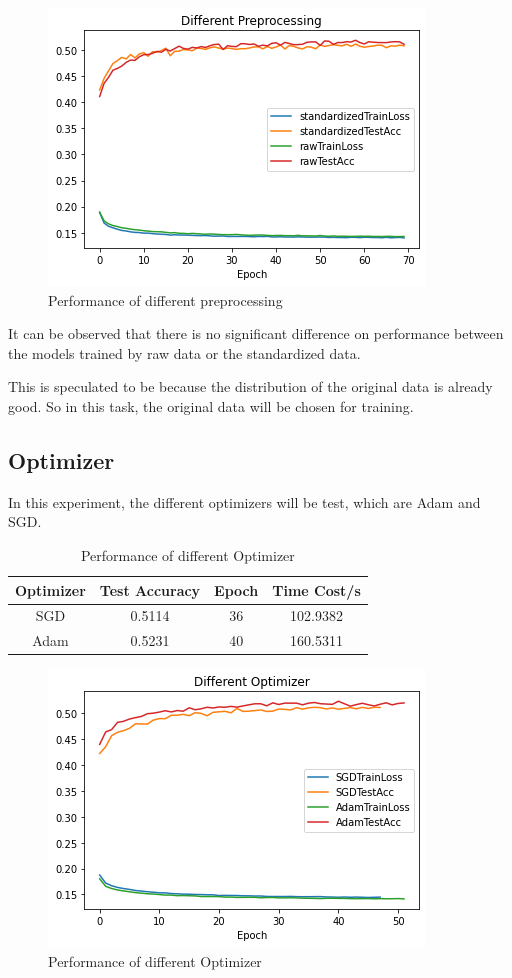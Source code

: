 \documentclass{article}[12pt]
\begin{document}
\begin{figure}[H]
    \centering
    \includegraphics[scale=0.5]{Figures/3.Preprocessing/download}
    \caption{Performance of different preprocessing}
\end{figure}

    It can be observed that there is no significant difference on performance
    between the models trained by raw data or the standardized data.

    This is speculated to be because the distribution of the original data is already good.
    So in this task, the original data will be chosen for training.

\subsection{Optimizer}

    In this experiment, the different optimizers will be test, which are Adam and SGD.

\begin{table}[H]\label{tab:table}
    \centering
    \begin{tabular}{|c|c|c|c|}
        \hline
        Optimizer & Test Accuracy & Epoch & Time Cost/s\\\hline
        SGD & 0.5114 & 36 & 102.9382\\\hline
        Adam & 0.5231 & 40 & 160.5311\\\hline
    \end{tabular}
    \caption{Performance of different Optimizer}
\end{table}

\begin{figure}[H]
    \centering
    \includegraphics[scale=0.5]{Figures/4.Optimizer/download}
    \caption{Performance of different Optimizer}
\end{figure}
\end{document}
